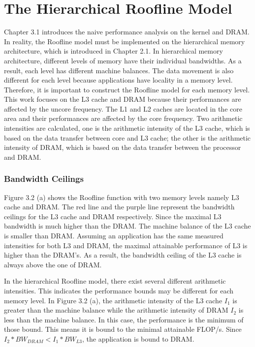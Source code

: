 \section{The Hierarchical Roofline Model}

Chapter 3.1 introduces the naive performance analysis on the kernel and DRAM. In reality, the Roofline model must be implemented on the hierarchical memory architecture, which is introduced in Chapter 2.1. In hierarchical memory architecture, different levels of memory have their individual bandwidths. As a result, each level has different machine balances. The data movement is also different for each level because applications have locality in a memory level. Therefore, it is important to construct the Roofline model for each memory level. This work focuses on the L3 cache and DRAM because their performances are affected by the uncore frequency. The L1 and L2 caches are located in the core area and their performances are affected by the core frequency. Two arithmetic intensities are calculated, one is the arithmetic intensity of the L3 cache, which is based on the data transfer between core and L3 cache; the other is the arithmetic intensity of DRAM, which is based on the data transfer between the processor and DRAM. 


\subsubsection{Bandwidth Ceilings}

Figure 3.2 (a) shows the Roofline function with two memory levels namely L3 cache and DRAM. The red line and the purple line represent the bandwidth ceilings for the L3 cache and DRAM respectively. Since the maximal L3 bandwidth is much higher than the DRAM. The machine balance of the L3 cache is smaller than DRAM. Assuming an application has the same measured intensities for both L3 and DRAM, the maximal attainable performance of L3 is higher than the DRAM's. As a result, the bandwidth ceiling of the L3 cache is always above the one of DRAM. 

In the hierarchical Roofline model, there exist several different arithmetic intensities. This indicates the performance bounds may be different for each memory level. In Figure 3.2 (a), the arithmetic intensity of the L3 cache $I_1$ is greater than the machine balance while the arithmetic intensity of DRAM $I_2$ is less than the machine balance. In this case, the performance is the minimum of those bound. This means it is bound to the minimal attainable FLOP/s. Since  $I_2 * BW_{DRAM}<I_1 * BW_{L3}$, the application is bound to DRAM.

